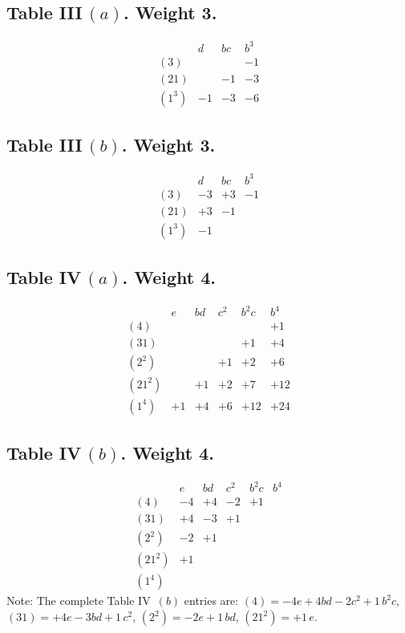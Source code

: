 \documentclass[11pt,a4paper]{article}
\begin{document}
\subsection*{Table III\,$(a)$. Weight 3.}
\[
\begin{array}{c|ccc}
& d & bc & b^3 \\ \hline
(3) & & & -1 \\
(21) & & -1 & -3 \\
(1^3) & -1 & -3 & -6
\end{array}
\]

\subsection*{Table III\,$(b)$. Weight 3.}
\[
\begin{array}{c|ccc}
& d & bc & b^3 \\ \hline
(3) & -3 & +3 & -1 \\
(21) & +3 & -1 & \\
(1^3) & -1 & &
\end{array}
\]

\newpage
\subsection*{Table IV\,$(a)$. Weight 4.}
\[
\begin{array}{c|ccccc}
& e & bd & c^2 & b^2 c & b^4 \\ \hline
(4) & & & & & +1 \\
(31) & & & & +1 & +4 \\
(2^2) & & & +1 & +2 & +6 \\
(21^2) & & +1 & +2 & +7 & +12 \\
(1^4) & +1 & +4 & +6 & +12 & +24
\end{array}
\]

\subsection*{Table IV\,$(b)$. Weight 4.}
\[
\begin{array}{c|ccccc}
& e & bd & c^2 & b^2 c & b^4 \\ \hline
(4) & -4 & +4 & -2 & +1 \\
(31) & +4 & -3 & +1 \\
(2^2) & -2 & +1 \\
(21^2) & +1 \\
(1^4)
\end{array}
\]
Note: The complete Table IV~$(b)$ entries are:
$(4) = -4e + 4bd - 2c^2 + 1\,b^2 c$, $(31) = +4e - 3bd + 1\,c^2$,
$(2^2) = -2e + 1\,bd$, $(21^2) = +1\,e$.
\end{document}
